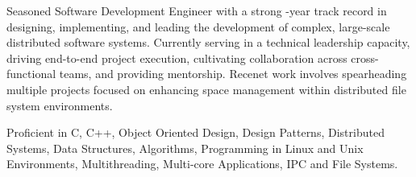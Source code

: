 
\setcounter{expyear}{\the\year}
\addtocounter{expyear}{-2006}

\begin{cvparagraph}

Seasoned Software Development Engineer with a strong -year track record in designing, implementing, and
leading the development of complex, large-scale distributed software systems. Currently serving in a technical leadership
capacity, driving end-to-end project execution, cultivating collaboration across cross-functional teams, and providing
mentorship. Recenet work involves spearheading multiple projects focused on enhancing space management within distributed
file system environments.
\end{cvparagraph}


\begin{cvparagraph}
 Proficient in C, C++, Object Oriented Design, Design Patterns, Distributed Systems, Data Structures, Algorithms,
	Programming in Linux and Unix Environments, Multithreading, Multi-core Applications, IPC and File Systems.
\end{cvparagraph}
